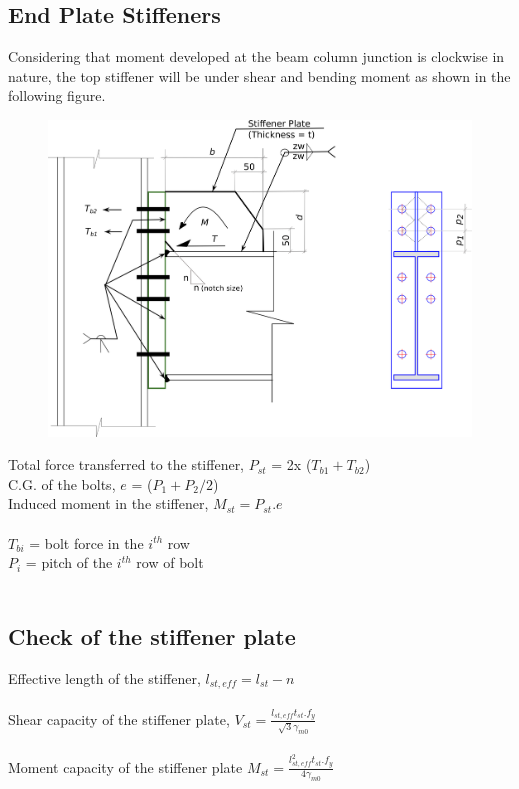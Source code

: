 \documentclass[11.5pt,a4paper,oneside]{report}
\begin{document}
\begin{Form}
\section{End Plate Stiffeners}
Considering that moment developed at the beam column junction is clockwise in nature, the top stiffener will be under shear and bending moment as shown in the following figure.\\

\begin{figure}[htp]
	\centering
	\includegraphics[scale=0.5]{EPStiffeners.png}
\end{figure}



\noindent
Total force transferred to the stiffener, $P_{st}$ = 2x ($T_{b1} + T_{b2}$)\\
C.G. of the bolts, $e$ = ($P_1 + P_2/2$)\\
Induced moment in the stiffener, $M_{st} = P_{st}.e$\\
\\
\indent $T_{bi}$ = bolt force in the $i^{th}$ row \\
\indent $P_i$ = pitch of the $i^{th}$ row of bolt\\
\\
\subsection{Check of the stiffener plate}
Effective length of the stiffener, $l_{st,eff} = l_{st} - n$\\
\\
Shear capacity of the stiffener plate, $V_{st} = \frac{l_{st,eff} t_{st} . f_y}{\sqrt{3} \gamma_{m0}}$\\
\\
Moment capacity of the stiffener plate $M_{st} = \frac{l_{st,eff}^2 t_{st} . f_y}{4 \gamma_{m0}}$\\
\\


\end{Form}
\end{document}

